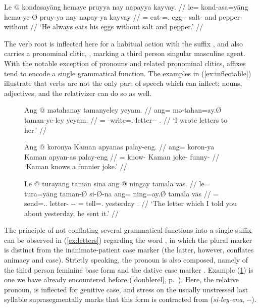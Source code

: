 \ex\label{ex:suffixation}%
\begingl
	\gla Le @ kondasayāng hemaye pruyya nay napayya kayvay. //
	\glb le= kond-asa=yāng hema-ye-Ø pruy-ya nay napay-ya kayvay //
	\glc \PatTI{}= eat-\Hab{}=\TsgM{}.\Aarg{} egg-\Pl{}-\Top{} salt-\Loc{} 
		and pepper-\Loc{} without //
	\glft `He always eats his eggs without salt and pepper.' //
\endgl\xe

The verb root  is inflected here for a habitual action
with the suffix , and also carries a pronominal
clitic, , marking a third person singular
masculine agent. With the notable exception of pronouns and related pronominal
clitics, affixes tend to encode a single grammatical function. The examples in
(\ref{ex:inflectable}) illustrate that verbs are not the only part of speech
which can inflect; nouns, adjectives, and the relativizer can do
so as well.

\begin{figure}[h]
\pex\label{ex:inflectable}
\a\label{ex:letters}\begingl
	\gla Ang @ mətahanay tamanyeley yeyam. //
	\glb ang= mə-tahan=ay.Ø taman-ye-ley yeyam. //
	\glc \AgtT{}= \Pst{}-write=\Fsg{}.\Top{} letter-\Pl{}-\PargI{} 
		\TsgF{}.\Dat{} //
	\glft `I wrote letters to her.' //
\endgl

\a\label{ex:adjinfl}\begingl
	\gla Ang @ koronya Kaman apyanas palay-eng. //
	\glb ang= koron-ya Kaman apyan-as palay-eng //
	\glc \AgtT{}= know-\TsgM{} Kaman joke-\Parg{} funny-\Comp{} //
	\glft `Kaman knows a funnier joke.' //
\endgl

\a\label{ex:relative}\begingl
	\gla Le @ turayāng taman sinā ang @ ningay tamala vās. //
	\glb le= tura=yāng taman-Ø si-Ø-na ang= ning=ay.Ø tamala vās //
	\glc \PatTI{}= send=\Tsg{}.\M{}.\Aarg{} letter-\Top{} 
		\Rel{}-\PatTI{}-\Gen{} \AgtT{}= tell=\Fsg{}.\Top{} yesterday 
		\Ssg{}.\Parg{} //
	\glft `The letter which I told you about yesterday, he sent it.' //
\endgl
\xe
\end{figure}

The principle of not conflating several grammatical functions into a single
suffix can be observed in (\ref{ex:letters}) regarding the word
, in which the plural marker 
 is distinct from the inanimate-patient case marker 
 (the latter, however, conflates animacy and case). Strictly 
speaking, the pronoun  is also composed, namely of
the third person feminine base form  and the dative case marker
. Example (\ref{ex:relative}) is one we have already 
encountered before (\autoref{doublerel}, p.~\pageref{doublerel}). Here, the
relative pronoun,  is inflected for genitive
case, and stress on the usually unstressed last syllable
suprasegmentally marks that this form is
contracted from  (\textit{si-ley-ena},
\Rel{}-\PargI{}-\Gen{}).

